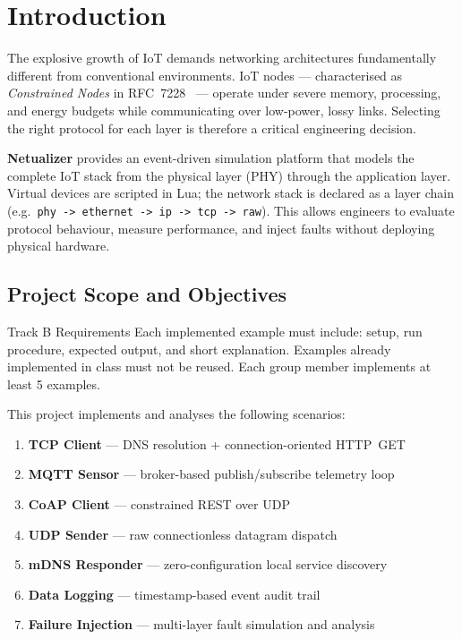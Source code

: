 \documentclass[12pt,a4paper]{article}
\begin{document}
\newpage

\section{Introduction}
\label{sec:intro}

The explosive growth of IoT demands networking architectures fundamentally
different from conventional environments. IoT nodes --- characterised as
\emph{Constrained Nodes} in RFC~7228~\cite{RFC7228} --- operate under severe
memory, processing, and energy budgets while communicating over low-power,
lossy links. Selecting the right protocol for each layer is therefore a
critical engineering decision.

\textbf{Netualizer} provides an event-driven simulation platform that models
the complete IoT stack from the physical layer (PHY) through the application
layer. Virtual devices are scripted in Lua; the network stack is declared as
a layer chain (e.g.\ \texttt{phy -> ethernet -> ip -> tcp -> raw}). This
allows engineers to evaluate protocol behaviour, measure performance, and
inject faults without deploying physical hardware.

\subsection*{Project Scope and Objectives}

\begin{infoblock}{Track B Requirements}
Each implemented example must include: setup, run procedure, expected output,
and short explanation. Examples already implemented in class must not be
reused. Each group member implements at least 5 examples.
\end{infoblock}

This project implements and analyses the following scenarios:

\begin{enumerate}
  \item \textbf{TCP Client} --- DNS resolution + connection-oriented HTTP~GET
  \item \textbf{MQTT Sensor} --- broker-based publish/subscribe telemetry loop
  \item \textbf{CoAP Client} --- constrained REST over UDP
  \item \textbf{UDP Sender} --- raw connectionless datagram dispatch
  \item \textbf{mDNS Responder} --- zero-configuration local service discovery
  \item \textbf{Data Logging} --- timestamp-based event audit trail
  \item \textbf{Failure Injection} --- multi-layer fault simulation and analysis
\end{enumerate}
\end{document}
